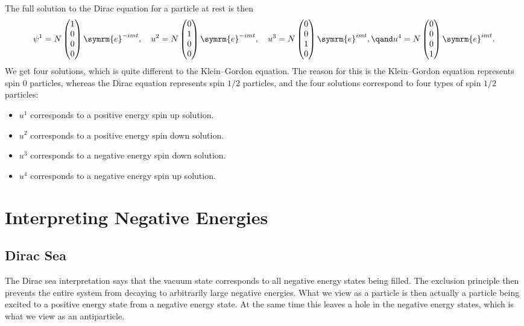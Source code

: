 \documentclass[fleqn]{NotesClass}
\newcommand{\e}{\symrm{e}}
\begin{document}
    The full solution to the Dirac equation for a particle at rest is then
    \begin{equation}
        \psi^1 = N
        \begin{pmatrix}
            1\\ 0\\ 0\\ 0
        \end{pmatrix}
        \e^{-imt}, \quad u^2 = N
        \begin{pmatrix}
            0\\ 1\\ 0\\ 0
        \end{pmatrix}
        \e^{-imt}, \quad u^3 = N
        \begin{pmatrix}
            0\\ 0\\ 1\\ 0
        \end{pmatrix}
        \e^{imt}, \qand u^4 = N
        \begin{pmatrix}
            0\\ 0\\ 0\\ 1
        \end{pmatrix}
        \e^{imt}.
    \end{equation}
    We get four solutions, which is quite different to the Klein--Gordon equation.
    The reason for this is the Klein--Gordon equation represents spin 0 particles, whereas the Dirac equation represents spin \(1/2\) particles, and the four solutions correspond to four types of spin \(1/2\) particles:
    \begin{itemize}
        \item \(u^1\) corresponds to a positive energy spin up solution.
        \item \(u^2\) corresponds to a positive energy spin down solution.
        \item \(u^3\) corresponds to a negative energy spin down solution.
        \item \(u^4\) corresponds to a negative energy spin up solution.
    \end{itemize}
    
    \section{Interpreting Negative Energies}
    \subsection{Dirac Sea}
    The Dirac sea interpretation says that the vacuum state corresponds to all negative energy states being filled.
    The exclusion principle then prevents the entire system from decaying to arbitrarily large negative energies.
    What we view as a particle is then actually a particle being excited to a positive energy state from a negative energy state.
    At the same time this leaves a hole in the negative energy states, which is what we view as an antiparticle.
    
\end{document}
